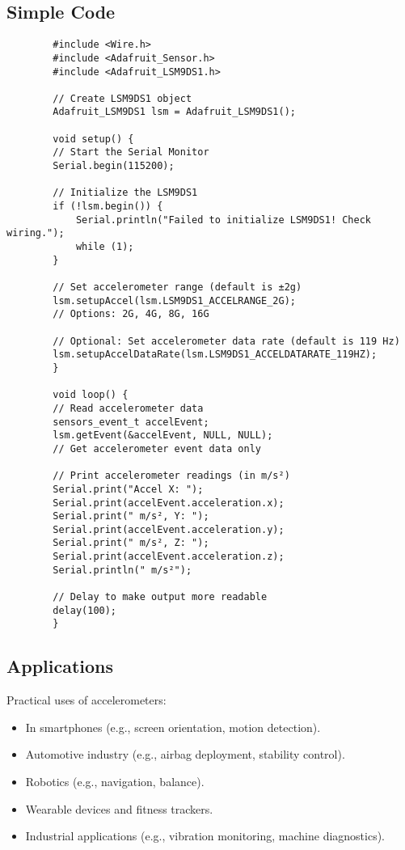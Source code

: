 \subsection{Simple Code}
\begin{verbatim}
		#include <Wire.h>
		#include <Adafruit_Sensor.h>
		#include <Adafruit_LSM9DS1.h>

		// Create LSM9DS1 object
		Adafruit_LSM9DS1 lsm = Adafruit_LSM9DS1();

		void setup() {
		// Start the Serial Monitor
		Serial.begin(115200);

		// Initialize the LSM9DS1
		if (!lsm.begin()) {
			Serial.println("Failed to initialize LSM9DS1! Check wiring.");
			while (1);
		}

		// Set accelerometer range (default is ±2g)
		lsm.setupAccel(lsm.LSM9DS1_ACCELRANGE_2G);  
		// Options: 2G, 4G, 8G, 16G

		// Optional: Set accelerometer data rate (default is 119 Hz)
		lsm.setupAccelDataRate(lsm.LSM9DS1_ACCELDATARATE_119HZ);
		}

		void loop() {
		// Read accelerometer data
		sensors_event_t accelEvent;
		lsm.getEvent(&accelEvent, NULL, NULL);  
		// Get accelerometer event data only

		// Print accelerometer readings (in m/s²)
		Serial.print("Accel X: ");
		Serial.print(accelEvent.acceleration.x);
		Serial.print(" m/s², Y: ");
		Serial.print(accelEvent.acceleration.y);
		Serial.print(" m/s², Z: ");
		Serial.print(accelEvent.acceleration.z);
		Serial.println(" m/s²");

		// Delay to make output more readable
		delay(100);
		}

\end{verbatim}
\subsection{Applications}
Practical uses of accelerometers:
\begin{itemize}
	\item In smartphones (e.g., screen orientation, motion detection).
	\item Automotive industry (e.g., airbag deployment, stability control).
	\item Robotics (e.g., navigation, balance).
	\item Wearable devices and fitness trackers.
	\item Industrial applications (e.g., vibration monitoring, machine diagnostics).
\end{itemize}
